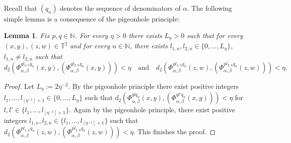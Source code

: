 \documentclass[JEP,XML,SOM,Unicode,NoEqCountersInSection]{cedram}
\theoremstyle{definition}
\theoremstyle{plain}
\newtheorem{lemma}[definition]{Lemma}
\newcommand\NN{\mathbb{N}}
\newcommand\TT{\mathbb{T}}
\begin{document}
Recall that $(q_n)$ denotes the sequence of denominators of $\alpha$. The following simple lemma is a consequence of the pigeonhole principle:

\begin{lemma}\label{lem:zar} Fix $p,q\in \NN$. For every $\eta>0$ there exists $L_\eta>0$ such that for every $(x,y),(z,w)\in \TT^2$ and for every $n\in \NN$, there exists $l_{1,n},l_{2,n}\in\{0,\ldots,L_\eta\}$, $l_{1,n}\neq l_{2,n}$ such that
\[
d_2(\Phi_{\alpha,\beta}^{ql_{1,n}q_n}(x,y),(\Phi_{\alpha,\beta}^{ql_{2,n}q_n}(x,y)))<\eta \quad \text{and}\quad d_2(\Phi_{\alpha,\beta}^{pl_{1,n}q_n}(z,w),(\Phi_{\alpha,\beta}^{pl_{2,n}q_n}(z,w)))<\eta.
\]
\end{lemma}
\begin{proof} Let $L_\eta:=2\eta^{-2}$. By the pigeonhole principle there exist positive integers $l_1,\ldots,l_{[\eta^{-1}]+1}\in \{0,\ldots,L_\eta\}$ such that $d_2(\Phi_{\alpha,\beta}^{qlq_n}(x,y),(\Phi_{\alpha,\beta}^{ql'q_n}(x,y)))<\eta$ for $l,l'\in\{l_1,\ldots,l_{[\eta^{-1}]+1}\}$. Again by the pigeonhole principle, there exist positive integers $l_{1,n},l_{2,n}\in \{l_1,\ldots,l_{[\eta^{-1}]+1}\}$ such that
$d_2(\Phi_{\alpha,\beta}^{pl_{1,n}q_n}(z,w),(\Phi_{\alpha,\beta}^{pl_{2,n}q_n}(z,w)))<\eta$. This finishes the proof.
\end{proof}
\end{document}
